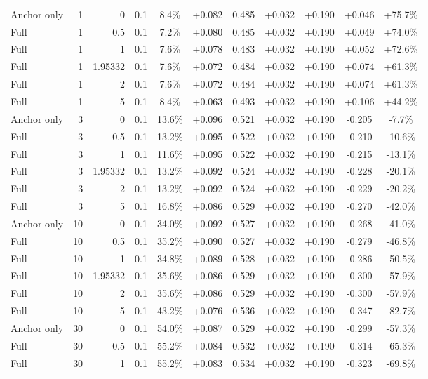 \begin{table}[htbp]
\begin{tabular}{lrrrccccccc}
Anchor only & 1 & 0 & 0.1 & 8.4\% & +0.082 & 0.485 & +0.032 & +0.190 & +0.046 & +75.7\% \\
Full & 1 & 0.5 & 0.1 & 7.2\% & +0.080 & 0.485 & +0.032 & +0.190 & +0.049 & +74.0\% \\
Full & 1 & 1 & 0.1 & 7.6\% & +0.078 & 0.483 & +0.032 & +0.190 & +0.052 & +72.6\% \\
Full & 1 & 1.95332 & 0.1 & 7.6\% & +0.072 & 0.484 & +0.032 & +0.190 & +0.074 & +61.3\% \\
Full & 1 & 2 & 0.1 & 7.6\% & +0.072 & 0.484 & +0.032 & +0.190 & +0.074 & +61.3\% \\
Full & 1 & 5 & 0.1 & 8.4\% & +0.063 & 0.493 & +0.032 & +0.190 & +0.106 & +44.2\% \\
Anchor only & 3 & 0 & 0.1 & 13.6\% & +0.096 & 0.521 & +0.032 & +0.190 & -0.205 & -7.7\% \\
Full & 3 & 0.5 & 0.1 & 13.2\% & +0.095 & 0.522 & +0.032 & +0.190 & -0.210 & -10.6\% \\
Full & 3 & 1 & 0.1 & 11.6\% & +0.095 & 0.522 & +0.032 & +0.190 & -0.215 & -13.1\% \\
Full & 3 & 1.95332 & 0.1 & 13.2\% & +0.092 & 0.524 & +0.032 & +0.190 & -0.228 & -20.1\% \\
Full & 3 & 2 & 0.1 & 13.2\% & +0.092 & 0.524 & +0.032 & +0.190 & -0.229 & -20.2\% \\
Full & 3 & 5 & 0.1 & 16.8\% & +0.086 & 0.529 & +0.032 & +0.190 & -0.270 & -42.0\% \\
Anchor only & 10 & 0 & 0.1 & 34.0\% & +0.092 & 0.527 & +0.032 & +0.190 & -0.268 & -41.0\% \\
Full & 10 & 0.5 & 0.1 & 35.2\% & +0.090 & 0.527 & +0.032 & +0.190 & -0.279 & -46.8\% \\
Full & 10 & 1 & 0.1 & 34.8\% & +0.089 & 0.528 & +0.032 & +0.190 & -0.286 & -50.5\% \\
Full & 10 & 1.95332 & 0.1 & 35.6\% & +0.086 & 0.529 & +0.032 & +0.190 & -0.300 & -57.9\% \\
Full & 10 & 2 & 0.1 & 35.6\% & +0.086 & 0.529 & +0.032 & +0.190 & -0.300 & -57.9\% \\
Full & 10 & 5 & 0.1 & 43.2\% & +0.076 & 0.536 & +0.032 & +0.190 & -0.347 & -82.7\% \\
Anchor only & 30 & 0 & 0.1 & 54.0\% & +0.087 & 0.529 & +0.032 & +0.190 & -0.299 & -57.3\% \\
Full & 30 & 0.5 & 0.1 & 55.2\% & +0.084 & 0.532 & +0.032 & +0.190 & -0.314 & -65.3\% \\
Full & 30 & 1 & 0.1 & 55.2\% & +0.083 & 0.534 & +0.032 & +0.190 & -0.323 & -69.8\% \\

\end{tabular}
\end{table}

